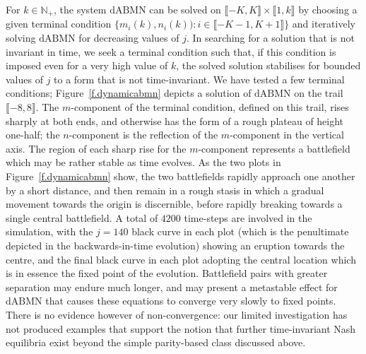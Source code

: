 \documentclass[letterpaper,11pt,oneside,reqno]{amsbook}
\newcommand{\N}{\ensuremath{\mathbb{N}}}
\numberwithin{figure}{chapter}
\theoremstyle{definition}
\theoremstyle{definition}
\theoremstyle{definition}
\theoremstyle{definition}
\theoremstyle{definition}
\newcommand{\intint}[1]{\llbracket 1,#1 \rrbracket}
\newcommand{\nwithoutzero}{\N_+}
\newcommand{\dabmnmac}{\textrm{dABMN}}
\begin{document}
 
For $k \in \nwithoutzero$, the system $\dabmnmac$ can be solved on $\llbracket -K,K \rrbracket \times \intint{k}$ by choosing a given terminal condition $\big\{ m_i(k),n_i(k) \big): i \in \llbracket -K-1,K+1 \rrbracket  \big\}$
and iteratively solving $\dabmnmac$ for decreasing values of $j$. In searching for a solution that is not invariant in time, we seek a  terminal condition such that,
if this condition is imposed even for a very high value of $k$, the solved solution stabilises for bounded values of $j$ to a form that is not time-invariant. We have tested a few terminal conditions; Figure~\ref{f.dynamicabmn} depicts a solution of $\dabmnmac$ on the trail $\llbracket -8,8 \rrbracket$. The $m$-component of the terminal condition, defined on this trail, rises sharply at both ends, and otherwise has the form of a rough plateau of height one-half; the $n$-component is the reflection of the $m$-component in the vertical axis. The region of each sharp rise for the $m$-component represents a battlefield which may be rather stable as time evolves. As the two plots in Figure~\ref{f.dynamicabmn} show, the two battlefields rapidly approach one another by a short distance, and then remain in a rough stasis in which a gradual movement towards the origin is discernible, before rapidly breaking towards a single central battlefield.
A total of $4200$ time-steps are involved in the simulation, with the $j=140$ black curve in each plot (which is the penultimate depicted in the backwards-in-time evolution) showing an eruption towards the centre, and the final black curve in each plot adopting the central location which is in essence the fixed point of the evolution. Battlefield pairs with greater separation may endure much longer, and may present a metastable effect for $\dabmnmac$ that causes these equations to converge very slowly to fixed points. There is no evidence however of non-convergence: our limited investigation has not produced examples that  support the notion that further time-invariant Nash equilibria exist beyond the simple parity-based class discussed above. 
\end{document}
